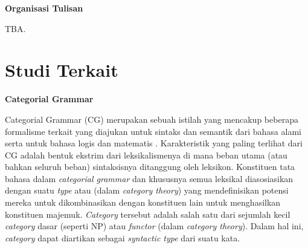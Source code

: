


\noindent \textbf{Organisasi Tulisan}

TBA.



\section{Studi Terkait}

\noindent\textbf{Categorial Grammar}

Categorial Grammar (CG) merupakan sebuah istilah yang mencakup beberapa formalisme terkait yang diajukan
untuk sintaks dan semantik dari bahasa alami serta untuk bahasa logis dan matematis \citep{Steedman92catg}.
Karakteristik yang paling terlihat dari CG adalah bentuk ekstrim dari leksikalismenya di mana beban utama
(atau bahkan seluruh beban) sintaksisnya ditanggung oleh leksikon.
Konstituen tata bahasa dalam \textit{categorial grammar} dan khususnya semua leksikal diasosiasikan
dengan suatu \textit{type} atau  (dalam \textit{category theory}) yang
mendefinisikan potensi mereka untuk dikombinasikan dengan konstituen lain untuk menghasilkan konstituen
majemuk.
\textit{Category} tersebut adalah salah satu dari sejumlah kecil \textit{category} dasar (seperti NP)
atau \textit{functor} (dalam \textit{category theory}).
Dalam hal ini, \textit{category} dapat diartikan sebagai \textit{syntactic type} dari suatu kata.

